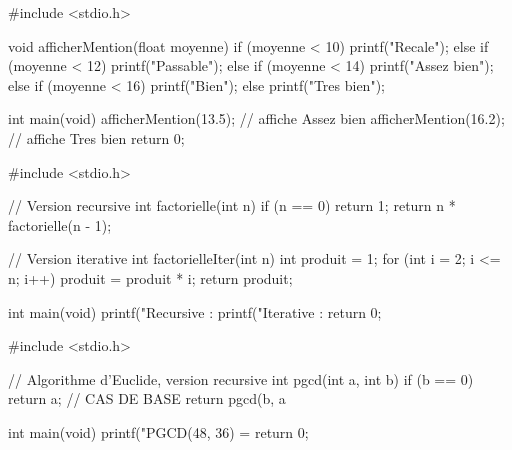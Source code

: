 \begin{codec}
#include <stdio.h>

void afficherMention(float moyenne) {
    if (moyenne < 10) {
        printf("Recale\n");
    } else if (moyenne < 12) {
        printf("Passable\n");
    } else if (moyenne < 14) {
        printf("Assez bien\n");
    } else if (moyenne < 16) {
        printf("Bien\n");
    } else {
        printf("Tres bien\n");
    }
}

int main(void) {
    afficherMention(13.5);   // affiche Assez bien
    afficherMention(16.2);   // affiche Tres bien
    return 0;
}
\end{codec}

\begin{codec}
#include <stdio.h>

// Version recursive
int factorielle(int n) {
    if (n == 0) {
        return 1;
    }
    return n * factorielle(n - 1);
}

// Version iterative
int factorielleIter(int n) {
    int produit = 1;
    for (int i = 2; i <= n; i++) {
        produit = produit * i;
    }
    return produit;
}

int main(void) {
    printf("Recursive : %
    printf("Iterative : %
    return 0;
}
\end{codec}


\begin{codec}
#include <stdio.h>

// Algorithme d'Euclide, version recursive
int pgcd(int a, int b) {
    if (b == 0) {
        return a;            // CAS DE BASE
    }
    return pgcd(b, a %
}

int main(void) {
    printf("PGCD(48, 36) = %
    return 0;
}
\end{codec}


